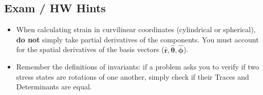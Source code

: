 \subsection*{Exam / HW Hints}
\begin{itemize}
    \item When calculating strain in curvilinear coordinates (cylindrical or spherical), \textbf{do not} simply take partial derivatives of the components. You must account for the spatial derivatives of the basis vectors ($\hat{\mathbf{r}}, \hat{\boldsymbol{\theta}}, \hat{\boldsymbol{\phi}}$).
    \item Remember the definitions of invariants: if a problem asks you to verify if two stress states are rotations of one another, simply check if their Traces and Determinants are equal.
\end{itemize}
